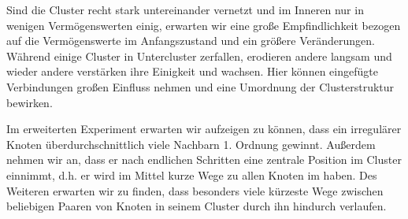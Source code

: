 \documentclass[11pt, a4paper]{scrartcl}
\begin{document}
Sind die Cluster recht stark untereinander vernetzt und im Inneren nur in wenigen Vermögenswerten einig, erwarten wir eine große Empfindlichkeit bezogen auf die Vermögenswerte im Anfangszustand und ein größere Veränderungen. Während einige Cluster in Untercluster zerfallen, erodieren andere langsam und wieder andere verstärken ihre Einigkeit und wachsen. Hier können eingefügte Verbindungen großen Einfluss nehmen und eine Umordnung der Clusterstruktur bewirken.

Im erweiterten Experiment erwarten wir aufzeigen zu können, dass ein irregulärer Knoten überdurchschnittlich viele Nachbarn 1. Ordnung gewinnt. Außerdem nehmen wir an, dass er nach endlichen Schritten eine zentrale Position im Cluster einnimmt, d.h. er wird im Mittel kurze Wege zu allen Knoten im  haben. Des Weiteren erwarten wir zu finden, dass besonders viele kürzeste Wege zwischen beliebigen Paaren von Knoten in seinem Cluster durch ihn hindurch verlaufen. 

\printbibliography
\end{document}
